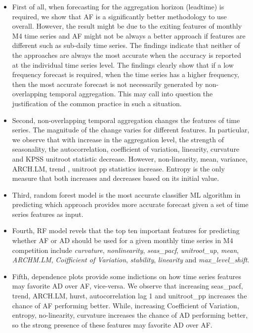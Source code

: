 \documentclass[preprint, 3p,
authoryear]{elsarticle} %
\begin{document}
\begin{itemize}
\item
  First of all, when forecasting for the aggregation horizon (leadtime)
  is required, we show that AF is a significantly better methodology to
  use overall. However, the result might be due to the exiting features
  of monthly M4 time series and AF might not be always a better approach
  if features are different such as sub-daily time series. The findings
  indicate that neither of the approaches are always the most accurate
  when the accuracy is reported at the individual time series level. The
  findings clearly show that if a low frequency forecast is required,
  when the time series has a higher frequency, then the most accurate
  forecast is not necessarily generated by non-overlapping temporal
  aggregation. This may call into question the justification of the
  common practice in such a situation.
\item
  Second, non-overlapping temporal aggregation changes the features of
  time series. The magnitude of the change varies for different
  features. In particular, we observe that with increase in the
  aggregation level, the strength of seasonality, the autocorrelation,
  coefficient of variation, linearity, curvature and KPSS unitroot
  statistic decrease. However, non-linearity, mean, variance, ARCH.LM,
  trend , unitroot pp statistics increase. Entropy is the only measure
  that both increases and decreases based on its initial value.
\item
  Third, random forest model is the most accurate classifier ML
  algorithm in predicting which approach provides more accurate forecast
  given a set of time series features as input.
\item
  Fourth, RF model revels that the top ten important features for
  predicting whether AF or AD should be used for a given monthly time
  series in M4 competition include \emph{curvature},
  \emph{nonlinearity}, \emph{seas\_pacf}, \emph{unitroot\_up},
  \emph{mean}, \emph{ARCHM.LM}, \emph{Coifficient of Variation},
  \emph{stability}, \emph{linearity} and \emph{max\_level\_shift}.
\item
  Fifth, dependence plots provide some indictions on how time series
  features may favorite AD over AF, vice-versa. We observe that
  increasing seas\_pacf, trend, ARCH.LM, hurst, autocorrelation lag 1
  and unitroot\_pp increases the chance of AF performing better. While,
  increasing Coefficient of Variation, entropy, no-linearity, curvature
  increases the chance of AD performing better, so the strong presence
  of these features may favorite AD over AF.
\end{itemize}
\end{document}
